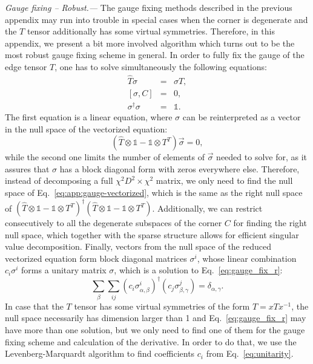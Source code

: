 \documentclass[twocolumn,floatfix,superscriptaddress,longbibliography,pra]{revtex4-2}
\newcommand{\nb}{\nonumber}
\renewcommand{\section}[1]{\emph{#1.---}}
\begin{document}
\section{Gauge fixing -- Robust}
\label{app:gauge_fixing_robust}
The gauge fixing methods described in the previous appendix may run into trouble in special cases when the corner is degenerate and the $T$ tensor additionally has some virtual symmetries. Therefore, in this appendix, we present a bit more involved algorithm which turns out to be the most robust gauge fixing scheme in general.
In order to fully fix the gauge of the edge tensor $T$, one has to solve simultaneously the following equations:
\begin{eqnarray}
\hat{T}\sigma &=& \sigma T, \nb \\
\left[\sigma,C \right] &=& 0, \nb \\
\sigma^\dagger \sigma &=& \mathbb{1} .
\label{eq:gauge_fix_r}
\end{eqnarray}
The first equation is a linear equation, where $\sigma$ can be reinterpreted as a vector in the null space of the vectorized equation:
\begin{equation}
\label{eq:app:gauge-vectorized}
    \left(\hat{T} \otimes \mathbb{1} - \mathbb{1}\otimes T^T\right)\vec{\sigma} = 0,
\end{equation}
while the second one limits the number of elements of $\vec{\sigma}$ needed to solve for, as it assures that $\sigma$ has a block diagonal form with zeros everywhere else. Therefore, instead of decomposing a full $\chi^2 D^2 \times \chi^2$ matrix, we only need to find the null space of Eq.~\eqref{eq:app:gauge-vectorized}, which is the same as the right null space of $\left(\hat{T} \otimes \mathbb{1} - \mathbb{1}\otimes T^T\right)^\dagger\left(\hat{T} \otimes \mathbb{1} - \mathbb{1}\otimes T^T\right)$. Additionally, we can restrict consecutively to all the degenerate subspaces of the corner $C$ for finding the right null space, which together with the sparse structure allows for efficient singular value decomposition. Finally, vectors from the null space of the reduced vectorized equation form block diagonal matrices $\sigma^i$, whose linear combination $c_i\sigma^i$ forms a unitary matrix $\sigma$, which is a solution to Eq.~\eqref{eq:gauge_fix_r}:
\begin{equation}
    \sum_{\beta}\sum_{ij} (c_i\sigma^i_{\alpha,\beta})^\dagger (c_j\sigma^j_{\beta,\gamma}) = \delta_{\alpha,\gamma}.
    \label{eq:unitarity}
\end{equation}
In case that the $T$ tensor has some virtual symmetries of the form $T = xTx^{-1}$, the null space  necessarily has dimension larger than 1 and Eq.~\eqref{eq:gauge_fix_r} may have more than one solution, but we only need to find one of them for the gauge fixing scheme and calculation of the derivative. In order to do that, we use the Levenberg-Marquardt algorithm to find coefficients $c_i$ from Eq.~\eqref{eq:unitarity}.
\end{document}
